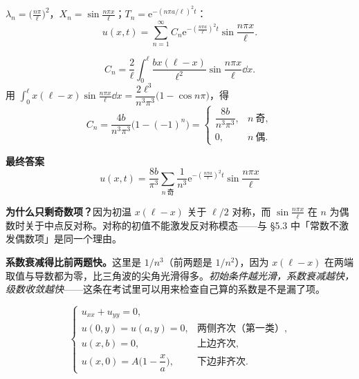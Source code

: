 \documentclass[11pt]{ctexart}
\begin{document}
$\lambda_n=\Big(\frac{n\pi}{\ell}\Big)^2$，$X_n=\sin\frac{n\pi x}{\ell}$；$T_n=\mathrm e^{-(n\pi a/\ell)^2t}$：
\begin{equation}
  u(x,t)=\sum_{n=1}^{\infty}C_n\mathrm e^{-\left(\frac{n\pi a}{\ell}\right)^2t}\sin\frac{n\pi x}{\ell}.
\end{equation}

\begin{equation}
  C_n=\frac{2}{\ell}\int_0^{\ell}\frac{bx(\ell-x)}{\ell^2}\sin\frac{n\pi x}{\ell}\dd x .
\end{equation}
用 $\int_0^{\ell}x(\ell-x)\sin\frac{n\pi x}{\ell}\dd x=\dfrac{2\ell^3}{n^3\pi^3}\big(1-\cos n\pi\big)$，得
\begin{equation}
  C_n=\frac{4b}{n^3\pi^3}\big(1-(-1)^n\big)=
  \begin{cases}
    \dfrac{8b}{n^3\pi^3}, & n\ \text{奇},\\[6pt]
    0, & n\ \text{偶}.
  \end{cases}
\end{equation}

\textbf{最终答案}
\begin{equation}
  \boxed{\;u(x,t)=\frac{8b}{\pi^3}\sum_{n\ \text{奇}}\frac{1}{n^3}
  \mathrm e^{-\left(\frac{n\pi a}{\ell}\right)^2t}\sin\frac{n\pi x}{\ell}\;}
\end{equation}

\textbf{为什么只剩奇数项？}因为初温 $x(\ell-x)$ 关于 $\ell/2$ 对称，而 $\sin\frac{n\pi x}{\ell}$ 在 $n$ 为偶数时关于中点反对称。对称的初值不能激发反对称模态——与 \S5.3 中「常数不激发偶数项」是同一个理由。

\textbf{系数衰减得比前两题快。}这里是 $1/n^3$（前两题是 $1/n^2$），因为 $x(\ell-x)$ 在两端取值与导数都为零，比三角波的尖角光滑得多。\emph{初始条件越光滑，系数衰减越快，级数收敛越快}——这条在考试里可以用来检查自己算的系数是不是漏了项。


\begin{equation}
  \begin{cases}
    u_{xx}+u_{yy}=0,\\
    u(0,y)=u(a,y)=0, & \text{两侧齐次（第一类）},\\
    u(x,b)=0, & \text{上边齐次},\\
    u(x,0)=A\Big(1-\dfrac{x}{a}\Big), & \text{下边非齐次}.
  \end{cases}
\end{equation}
\end{document}

